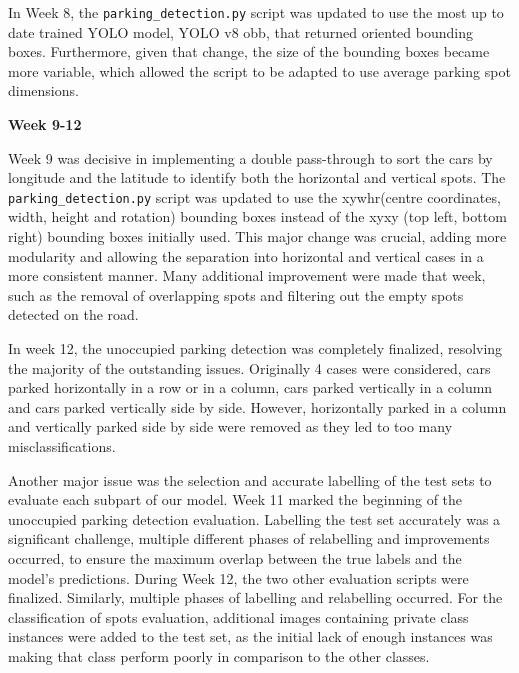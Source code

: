 In Week 8, the \texttt{parking\_detection.py} script was updated to use the most
up to date trained YOLO model, YOLO v8 obb, that returned oriented bounding
boxes. Furthermore, given that change, the size of
the bounding boxes became more variable, which allowed the script to be adapted
to use average parking spot dimensions.

\textbf{Week 9-12}

Week 9 was decisive in implementing a double pass-through to sort the cars by
longitude and the latitude to identify both the horizontal and vertical spots.
The \texttt{parking\_detection.py} script was updated to use the
xywhr(centre coordinates, width, height and rotation) bounding boxes instead of
the xyxy (top left, bottom right)  bounding boxes initially used. This
major change was crucial, adding more modularity and allowing the
separation into horizontal and vertical cases in a more consistent manner.
Many additional improvement were made that week, such as the removal of
overlapping spots and filtering out the empty spots detected on the road.

In week 12, the unoccupied parking detection was completely finalized, resolving the
majority of the outstanding issues.
Originally 4 cases were considered, cars parked horizontally in a row or in a
column, cars parked vertically in a column and cars parked vertically side by
side. However, horizontally parked in a column and vertically parked side by side
were removed as they led to too many misclassifications.

Another major issue was the selection and accurate labelling of the test sets to
evaluate each subpart of our model.
Week 11 marked the beginning of the unoccupied parking detection evaluation. 
Labelling the test set accurately was a significant challenge, multiple different 
phases of relabelling and improvements occurred, to ensure the maximum overlap 
between the true labels and the model's predictions.
During Week 12, the two other evaluation scripts were finalized. 
Similarly, multiple phases of labelling and relabelling occurred. For
the classification of spots evaluation, additional images containing private class instances
were added to the test set, as the initial lack of enough instances was making
that class perform poorly in comparison to the other classes.

\newpage{}